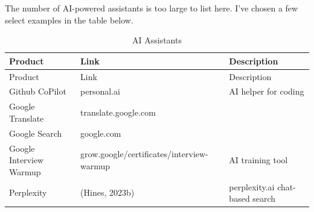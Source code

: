 \documentclass[
  12pt,
  letterpaper,
  DIV=11,
  numbers=noendperiod]{scrartcl}
\begin{document}
The number of AI-powered assistants is too large to list here. I've
chosen a few select examples in the table below.

\def\pandoctableshortcapt{AI Assistants}

\begin{longtable}[]{@{}
  >{\raggedright\arraybackslash}p{}
  >{\raggedright\arraybackslash}p{}
  >{\raggedright\arraybackslash}p{}@{}}
\caption[AI Assistants]{AI Assistants}\tabularnewline
\toprule\noalign{}
\begin{minipage}[b]{\linewidth}\raggedright
Product
\end{minipage} & \begin{minipage}[b]{\linewidth}\raggedright
Link
\end{minipage} & \begin{minipage}[b]{\linewidth}\raggedright
Description
\end{minipage} \\
\midrule\noalign{}
\endfirsthead
\toprule\noalign{}
\begin{minipage}[b]{\linewidth}\raggedright
Product
\end{minipage} & \begin{minipage}[b]{\linewidth}\raggedright
Link
\end{minipage} & \begin{minipage}[b]{\linewidth}\raggedright
Description
\end{minipage} \\
\midrule\noalign{}
\endhead
\bottomrule\noalign{}
\endlastfoot
Github CoPilot & personal.ai & AI helper for coding \\
Google Translate & translate.google.com & \\
Google Search & google.com & \\
Google Interview Warmup & grow.google/certificates/interview-warmup & AI
training tool \\
Perplexity & (Hines, 2023b) & perplexity.ai chat-based search \\
\end{longtable}

\let\pandoctableshortcapt\relax
\end{document}
